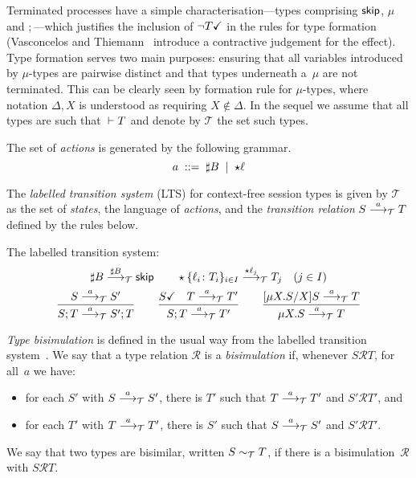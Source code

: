 Terminated processes have a simple characterisation---types comprising
$\skipk$, $\mu$ and $;$---which justifies the inclusion of
$\neg\DONE T$ in the rules for type formation (Vasconcelos and
Thiemann~\cite{thiemann2016context} introduce a contractive judgement
for the effect).
%
Type formation serves two main purposes: ensuring that all variables
introduced by $\mu$-types are pairwise distinct and that types
underneath a~$\mu$ are not terminated. This can be clearly seen by
formation rule for $\mu$-types, where notation $\Delta,X$ is
understood as requiring $X\notin\Delta$.
%
In the sequel we assume that all types are such that $\isType[] T$ and
denote by $\mathcal{T}$ the set such types.

The set of \emph{actions} is generated by the following grammar.
\begin{equation*}
  a \grmeq \sharp B \grmor \star \ell
\end{equation*}

The \emph{labelled transition system} (LTS) for context-free session
types is given by $\mathcal{T}$ as the set of \emph{states}, the
language of \emph{actions}, and the \emph{transition relation}
$S\LTSderives T$ defined by the rules below.

\noindent The labelled transition system:\hfill{}
%
\begin{gather*}
  \sharp B \LTSderives[\sharp B] \skipk
  \qquad
  \star\{\ell_i\colon T_i\}_{i\in I} \LTSderives[\star \ell_j] T_j\quad
  (j\in I)
  \\
  \frac{S \LTSderives S'}{S; T \LTSderives S';T}
  \qquad
  \frac{\DONE{S} \quad T \LTSderives T'}{S; T \LTSderives T'}
  \qquad
  \frac{\subs{\mu X.S}{X}S \LTSderives T}{\mu X.S \LTSderives T}
\end{gather*}

\emph{Type bisimulation} is defined in the usual way from the labelled
transition system~\cite{sangiorgi2014introduction}.
%
We say that a type relation $\mathcal R$ is a \emph{bisimulation} if,
whenever $S\mathcal RT$, for all~$a$ we have:
%
\begin{itemize}
\item for each $S'$ with $S \LTSderives S'$, there is $T'$ such that $T
  \LTSderives T'$ and $S'\mathcal RT'$, and
\item for each $T'$ with $T \LTSderives T'$, there is $S'$ such that $S
  \LTSderives S'$ and $S'\mathcal RT'$.
\end{itemize}
%
We say that two types are bisimilar, written $S \bisim T$, if there
is a bisimulation~$\mathcal R$ with $S\mathcal RT$.

